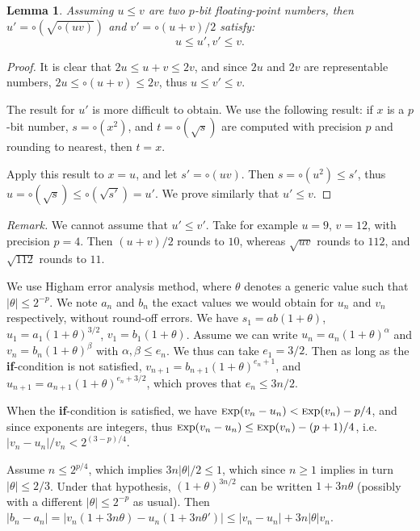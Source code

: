 \documentclass[12pt]{amsart}
\def\Exp{{\rm \textsc exp}}
\newtheorem{lemma}{Lemma}
\begin{document}
\begin{lemma}
Assuming $u \leq v$ are two $p$-bit floating-point numbers,
then $u' = \circ(\sqrt{\circ(uv)})$ and $v' = \circ(u+v)/2$ satisfy:
\[ u \leq u',v' \leq v. \]
\end{lemma}
\begin{proof}
It is clear that $2u \leq u+v \leq 2v$, and since $2u$ and $2v$ are
representable numbers, $2u \leq \circ(u+v) \leq 2v$, thus
$u \leq v' \leq v$.

The result for $u'$ is more difficult to obtain.
We use the following result: if $x$ is a $p$-bit number,
$s = \circ(x^2)$, and $t = \circ(\sqrt{s})$ are computed with precision $p$
and rounding to nearest, then $t = x$.

Apply this result to $x=u$, and let $s' = \circ(u v)$.
Then $s = \circ(u^2) \leq s'$, thus $u = \circ(\sqrt{s}) \leq \circ(\sqrt{s'})
= u'$. We prove similarly that $u' \leq v$.
\end{proof}
\noindent
\textsl{Remark.} We cannot assume that $u' \leq v'$. Take for example
$u = 9$, $v = 12$, with precision $p=4$.
Then $(u+v)/2$ rounds to $10$, whereas $\sqrt{uv}$ rounds to $112$,
and $\sqrt{112}$ rounds to $11$.

\medskip

We use Higham error analysis method, where $\theta$ denotes a generic value
such that $|\theta| \leq 2^{-p}$.
We note $a_n$ and $b_n$ the exact values we would obtain for $u_n$ and $v_n$
respectively, without round-off errors.
We have $s_1 = ab (1+\theta)$, $u_1 = a_1 (1+\theta)^{3/2}$,
$v_1 = b_1 (1+\theta)$.
Assume we can write $u_n = a_n (1+\theta)^{\alpha}$ and
$v_n = b_n(1+\theta)^{\beta}$ with $\alpha, \beta \leq e_n$.
We thus can take $e_1 = 3/2$.
Then as long as the \textbf{if}-condition is not satisfied,
$v_{n+1} = b_{n+1} (1+\theta)^{e_n+1}$,
and $u_{n+1} = a_{n+1} (1+\theta)^{e_n + 3/2}$,
which proves that $e_n \leq 3n/2$.

When the \textbf{if}-condition is satisfied,
we have $\Exp(v_n-u_n) < \Exp(v_n) - p/4$,
and since exponents are integers,
thus $\Exp(v_n-u_n) \leq \Exp(v_n) - (p+1)/4$,
i.e.\ $|v_n-u_n|/v_n < 2^{(3-p)/4}$.

Assume $n \leq 2^{p/4}$, which implies
$3n|\theta|/2 \leq 1$, which since $n \geq 1$ implies in turn $|\theta| \leq
2/3$. Under that hypothesis, $(1+\theta)^{3n/2}$ can be written
$1 + 3n\theta$ (possibly with a different $|\theta| \leq 2^{-p}$ as usual).
Then $|b_n-a_n| = |v_n (1+3n\theta) - u_n (1+3n\theta')|
\leq |v_n-u_n| + 3n |\theta| v_n$.
\end{document}
